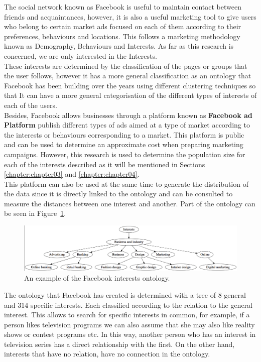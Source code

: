 The social network known as Facebook is useful to maintain contact between friends and acquaintances, however, it is also a useful marketing tool to give users who belong to certain market ads focused on each of them according to their preferences, behaviours and locations. This follows a marketing methodology known as Demography, Behaviours and Interests. As far as this research is concerned, we are only interested in the Interests.\\

These interests are determined by the classification of the pages or groups that the user follows, however it has a more general classification as an ontology that Facebook has been building over the years using different clustering techniques so that It can have a more general categorisation of the different types of interests of each of the users.\\

Besides, Facebook allows businesses through a platform known as \textbf{Facebook ad Platform} \cite{facebook_business} publish different types of ads aimed at a type of market according to the interests or behaviours corresponding to a market. This platform is public and can be used to determine an approximate cost when preparing marketing campaigns. However, this research is used to determine the population size for each of the interests described as it will be mentioned in Sections \ref{chapter:chapter03} and \ref{chapter:chapter04}.\\

This platform can also be used at the same time to generate the distribution of the data since it is directly linked to the ontology and can be consulted to measure the distances between one interest and another. Part of the ontology can be seen in Figure~\ref{fig:facebook_ontology_02}.\\

\begin{figure}
    \centering
    \includegraphics[width=150mm]{ontology.png}
    \caption {An example of the Facebook interests ontology.}
    \label{fig:facebook_ontology_02}
\end{figure}

The ontology that Facebook has created is determined with a tree of 8 general and 314 specific interests. Each classified according to the relation to the general interest. This allows to search for specific interests in common, for example, if a person likes television programs we can also assume that she may also like reality shows or contest programs etc. In this way, another person who has an interest in television series has a direct relationship with the first. On the other hand, interests that have no relation, have no connection in the ontology.\\

